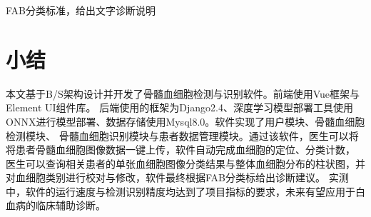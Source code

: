 FAB分类标准，给出文字诊断说明

\section{小结}
本文基于B/S架构设计并开发了骨髓血细胞检测与识别软件。前端使用Vue框架与Element UI组件库。
后端使用的框架为Django2.4、深度学习模型部署工具使用ONNX进行模型部署、数据存储使用Mysql8.0。软件实现了用户模块、骨髓血细胞检测模块、
骨髓血细胞识别模块与患者数据管理模块。通过该软件，医生可以将将患者骨髓血细胞图像数据一键上传，软件自动完成血细胞的定位、分类计数，
医生可以查询相关患者的单张血细胞图像分类结果与整体血细胞分布的柱状图，并对血细胞类别进行校对与修改，软件最终根据FAB分类标给出诊断建议。
实测中，软件的运行速度与检测识别精度均达到了项目指标的要求，未来有望应用于白血病的临床辅助诊断。

